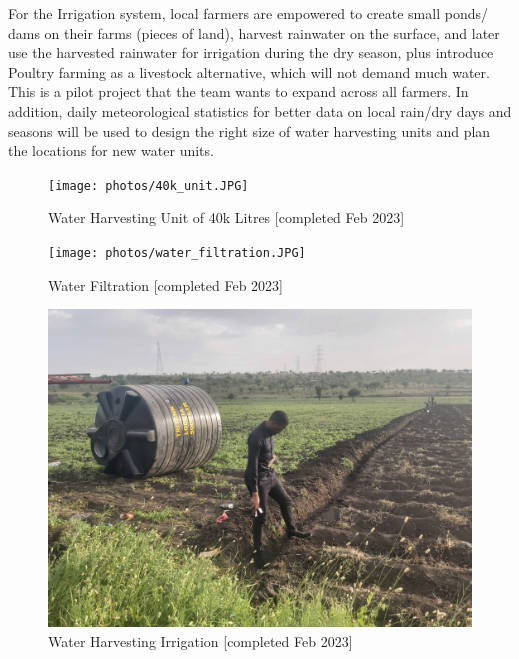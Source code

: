 \documentclass[10pt, twocolumn]{article}
\begin{document}
For the Irrigation system, local farmers are empowered to create small ponds/ dams on their farms (pieces of land), harvest rainwater on the surface, and later use the harvested rainwater for irrigation during the dry season, plus introduce Poultry farming as a livestock alternative, which will not demand much water. This is a pilot project that the team wants to expand across all farmers. In addition, daily meteorological statistics for better data on local rain/dry days and seasons will be used to design the right size of water harvesting units and plan the locations for new water units.

\begin{figure}
    \centering
    \texttt{[image: photos/40k\_unit.JPG]}
    \caption{Water Harvesting Unit of 40k Litres [completed Feb 2023]}
    \label{fig:40k_unit}
\end{figure}


\begin{figure}
    \centering
    \texttt{[image: photos/water\_filtration.JPG]}
    \caption{Water Filtration [completed Feb 2023]}
    \label{fig:filtration_unit}
\end{figure}


\begin{figure}
    \centering
    \includegraphics[width=1\linewidth]{photos/Irrigation_Unit.jpg}
    \caption{Water Harvesting Irrigation [completed Feb 2023]}
    \label{fig:irrigation_unit}
\end{figure}
\end{document}
